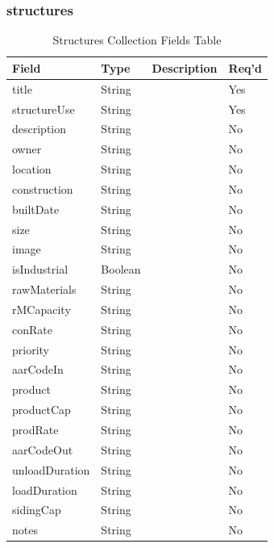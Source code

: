 \subsubsection{structures}
\begin{table}[H]
    \begin{tabular}{|L{3cm}|L{1.7cm}|L{8.8cm}|L{1.3cm}|}
    \hline
        \textbf{Field} & \textbf{Type} & \textbf{Description} & \textbf{Req'd} \\ \hline
	title & String &  & Yes \\ \hline
	structureUse & String &  & Yes \\ \hline
	description & String &  & No \\ \hline
	owner & String &  & No \\ \hline
	location & String &  & No \\ \hline
	construction & String &  & No \\ \hline
	builtDate & String &  & No \\ \hline
	size & String &  & No \\ \hline
	image & String &  & No \\ \hline
	isIndustrial & Boolean &  & No \\ \hline
	rawMaterials & String &  & No \\ \hline
	rMCapacity & String &  & No \\ \hline
	conRate & String &  & No \\ \hline
	priority & String &  & No \\ \hline
	aarCodeIn & String &  & No \\ \hline
	product & String &  & No \\ \hline
	productCap & String &  & No \\ \hline
	prodRate & String &  & No \\ \hline
	aarCodeOut & String &  & No \\ \hline
	unloadDuration & String &  & No \\ \hline
	loadDuration & String &  & No \\ \hline
	sidingCap & String &  & No \\ \hline
	notes & String &  & No \\ \hline
    \end{tabular}
    \caption{\label{structure-table}Structures Collection Fields Table}
    \end{table}

